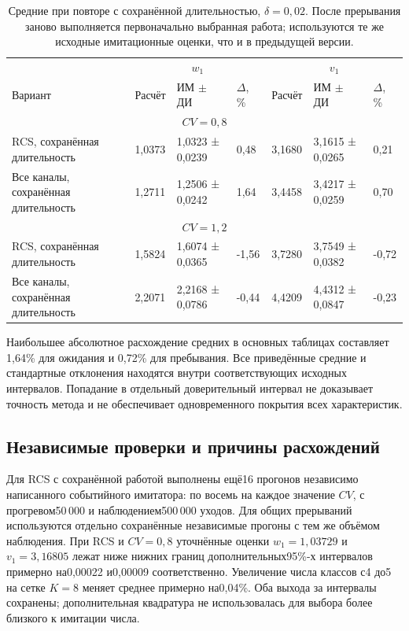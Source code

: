 \begin{table}[!htbp]
\centering\small\setlength{\tabcolsep}{2pt}
\begin{tabular}{@{}p{4.16cm}p{1.61cm}p{2.83cm}p{1.28cm}p{1.61cm}p{2.83cm}p{1.28cm}@{}}
\toprule
 & \multicolumn{3}{c}{$w_1$} & \multicolumn{3}{c}{$v_1$} \\
Вариант & Расчёт & ИМ $\pm$ ДИ & $\Delta$, \% & Расчёт & ИМ $\pm$ ДИ & $\Delta$, \% \\
\midrule
\multicolumn{7}{c}{$CV=0,8$} \\
RCS, сохранённая длительность & 1,0373 & 1,0323 ± 0,0239 & 0,48 & 3,1680 & 3,1615 ± 0,0265 & 0,21 \\
Все каналы, сохранённая длительность & 1,2711 & 1,2506 ± 0,0242 & 1,64 & 3,4458 & 3,4217 ± 0,0259 & 0,70 \\
\multicolumn{7}{c}{$CV=1,2$} \\
RCS, сохранённая длительность & 1,5824 & 1,6074 ± 0,0365 & -1,56 & 3,7280 & 3,7549 ± 0,0382 & -0,72 \\
Все каналы, сохранённая длительность & 2,2071 & 2,2168 ± 0,0786 & -0,44 & 4,4209 & 4,4312 ± 0,0847 & -0,23 \\
\bottomrule
\end{tabular}
\caption{Средние при повторе с сохранённой длительностью, $\delta=0{,}02$. После прерывания заново выполняется первоначально выбранная работа; используются те же исходные имитационные оценки, что и в предыдущей версии.}
\label{tab:results_fixed}
\end{table}

Наибольшее абсолютное расхождение средних в основных таблицах составляет 1,64\% для ожидания и 0,72\% для пребывания. Все приведённые средние и стандартные отклонения находятся внутри соответствующих исходных интервалов. Попадание в отдельный доверительный интервал не доказывает точность метода и не обеспечивает одновременного покрытия всех характеристик.

\subsection{Независимые проверки и причины расхождений}
Для RCS с сохранённой работой выполнены ещё16 прогонов независимо написанного событийного имитатора: по восемь на каждое значение \(CV\), с прогревом50\,000 и наблюдением500\,000 уходов. Для общих прерываний используются отдельно сохранённые независимые прогоны с тем же объёмом наблюдения. При RCS и \(CV=0{,}8\) уточнённые оценки \(w_1=1{,}03729\) и \(v_1=3{,}16805\) лежат ниже нижних границ дополнительных95\%-х интервалов примерно на0{,}00022 и0{,}00009 соответственно. Увеличение числа классов с4 до5 на сетке \(K=8\) меняет среднее примерно на0{,}04\%. Оба выхода за интервалы сохранены; дополнительная квадратура не использовалась для выбора более близкого к имитации числа.

